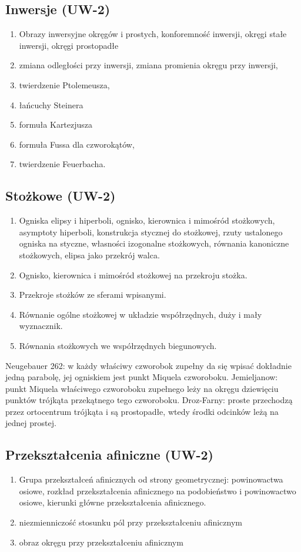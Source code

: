 \subsection{Inwersje (UW-2)}
\begin{enumerate}
	\item Obrazy inwersyjne okręgów i prostych, konforemność inwersji, okręgi stałe inwersji, okręgi prostopadłe
	\item zmiana odległości przy inwersji, zmiana promienia okręgu przy inwersji,
	\item twierdzenie Ptolemeusza,
	\item łańcuchy Steinera
	\item formuła Kartezjusza
	\item formuła Fussa dla czworokątów,
	\item twierdzenie Feuerbacha.
\end{enumerate}

\subsection{Stożkowe (UW-2)}
\begin{enumerate}
	\item Ogniska elipsy i hiperboli, ognisko, kierownica i mimośród stożkowych, asymptoty hiperboli, konstrukcja stycznej do stożkowej, rzuty ustalonego ogniska na styczne, własności izogonalne stożkowych, równania kanoniczne stożkowych, elipsa jako przekrój walca.
	\item Ognisko, kierownica i mimośród stożkowej na przekroju stożka.
	\item Przekroje stożków ze sferami wpisanymi.
	\item Równanie ogólne stożkowej w układzie współrzędnych, duży i mały wyznacznik.
	\item Równania stożkowych we współrzędnych biegunowych.
\end{enumerate}

Neugebauer 262: w każdy właściwy czworobok zupełny da się wpisać dokładnie jedną parabolę, jej ogniskiem jest punkt Miquela czworoboku.
Jemieljanow: punkt Miquela właściwego czworoboku zupełnego leży na okręgu dziewięciu punktów trójkąta przekątnego tego czworoboku.
Droz-Farny: proste przechodzą przez ortocentrum trójkąta i są prostopadłe, wtedy środki odcinków leżą na jednej prostej.

\subsection{Przekształcenia afiniczne (UW-2)}
\begin{enumerate}
	\item Grupa przekształceń afinicznych od strony geometrycznej: powinowactwa osiowe, rozkład przekształcenia afinicznego na podobieństwo i powinowactwo osiowe, kierunki główne przekształcenia afinicznego.
	\item niezmienniczość stosunku pól przy przekształceniu afinicznym
	\item obraz okręgu przy przekształceniu afinicznym
\end{enumerate}

